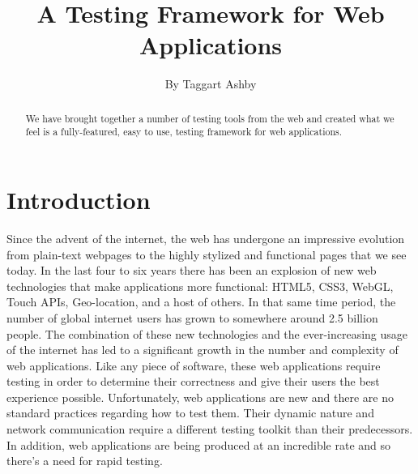 \documentclass[11pt]{article}
\begin{document}

\title{\vfill A Testing Framework for Web Applications} %
\author{
By Taggart Ashby \vspace{10pt} \\
}

\maketitle

\vfill  %

\begin{abstract}
We have brought together a number of testing tools from the web and created what we feel is a fully-featured, easy to use, testing framework for web applications.
\end{abstract}

\thispagestyle{empty} %
\newpage


\setcounter{page}{1}

\section{Introduction}
Since the advent of the internet, the web has undergone an impressive evolution from plain-text webpages to the highly stylized and functional pages that we see today. In the last four to six years there has been an explosion of new web technologies that make applications more functional: HTML5, CSS3, WebGL, Touch APIs, Geo-location, and a host of others. \cite{EvolutionOfWeb} In that same time period, the number of global internet users has grown to somewhere around 2.5 billion people. \cite{EvolutionOfWeb} The combination of these new technologies and the ever-increasing usage of the internet has led to a significant growth in the number and complexity of web applications.
Like any piece of software, these web applications require testing in order to determine their correctness and give their users the best experience possible. Unfortunately, web applications are new and there are no standard practices regarding how to test them. Their dynamic nature and network communication require a different testing toolkit than their predecessors. In addition, web applications are being produced at an incredible rate and so there's a need for rapid testing.
\end{document}

